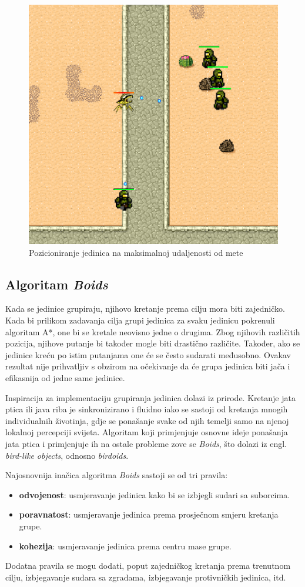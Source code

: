 \documentclass[times, utf8, zavrsni, numeric]{fer}
\begin{document}
\begin{figure}[h]
	\centering
	\includegraphics[width=0.5\linewidth]{images/enemySeparation.png}
	\caption{Pozicioniranje jedinica na maksimalnoj udaljenosti od mete}
	\label{fig:enemySeparation}
\end{figure}

\subsection{Algoritam \textit{Boids}}\label{ssec:boids}

\par Kada se jedinice grupiraju, njihovo kretanje prema cilju mora biti zajedničko.
Kada bi prilikom zadavanja cilja grupi jedinica za svaku jedinicu pokrenuli algoritam A*, one bi se kretale neovisno jedne o drugima. 
Zbog njihovih različitih pozicija, njihove putanje bi također mogle biti drastično različite. 
Također, ako se jedinice kreću po istim putanjama one će se često sudarati međusobno. 
Ovakav rezultat nije prihvatljiv s obzirom na očekivanje da će grupa jedinica biti jača i efikasnija od jedne same jedinice.

\par Inspiracija za implementaciju grupiranja jedinica dolazi iz prirode. 
Kretanje jata ptica ili java riba je sinkronizirano i fluidno iako se sastoji od kretanja mnogih individualnih životinja, gdje se ponašanje svake od njih temelji samo na njenoj lokalnoj percepciji svijeta.
Algoritam koji primjenjuje osnovne ideje ponašanja jata ptica i primjenjuje ih na ostale probleme zove se \textit{Boids}, što dolazi iz engl. \textit{bird-like objects}, odnosno \textit{birdoids}\cite{article:FlocksHerdsSchools}.

\par Najosnovnija inačica algoritma \textit{Boids} sastoji se od tri pravila:
\begin{itemize}
	\item \textbf{odvojenost}: usmjeravanje jedinica kako bi se izbjegli sudari sa suborcima.
	\item \textbf{poravnatost}: usmjeravanje jedinica prema prosječnom smjeru kretanja grupe.
	\item \textbf{kohezija}: usmjeravanje jedinica prema centru mase grupe. 	 
\end{itemize}
Dodatna pravila se mogu dodati, poput zajedničkog kretanja prema trenutnom cilju, izbjegavanje sudara sa zgradama, izbjegavanje protivničkih jedinica, itd.
\end{document}
